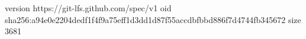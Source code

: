 version https://git-lfs.github.com/spec/v1
oid sha256:a94e0e2204dedf1f4f9a75eff1d3dd1d87f55accdbfbbd886f7d4744fb345672
size 3681

